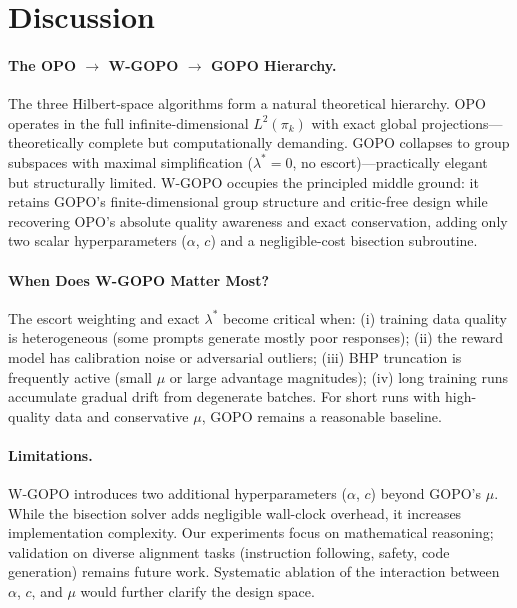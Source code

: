 \documentclass[11pt]{article}
\theoremstyle{definition}
\theoremstyle{remark}
\newcommand{\pik}{\pi_k}
\begin{document}
\section{Discussion}
\label{sec:discussion}

\paragraph{The OPO $\to$ W-GOPO $\to$ GOPO Hierarchy.}
The three Hilbert-space algorithms form a natural theoretical hierarchy. OPO operates in the full infinite-dimensional $L^2(\pik)$ with exact global projections---theoretically complete but computationally demanding. GOPO collapses to group subspaces with maximal simplification ($\lambda^* = 0$, no escort)---practically elegant but structurally limited. W-GOPO occupies the principled middle ground: it retains GOPO's finite-dimensional group structure and critic-free design while recovering OPO's absolute quality awareness and exact conservation, adding only two scalar hyperparameters ($\alpha$, $c$) and a negligible-cost bisection subroutine.

\paragraph{When Does W-GOPO Matter Most?}
The escort weighting and exact $\lambda^*$ become critical when: (i) training data quality is heterogeneous (some prompts generate mostly poor responses); (ii) the reward model has calibration noise or adversarial outliers; (iii) BHP truncation is frequently active (small $\mu$ or large advantage magnitudes); (iv) long training runs accumulate gradual drift from degenerate batches. For short runs with high-quality data and conservative $\mu$, GOPO remains a reasonable baseline.

\paragraph{Limitations.}
W-GOPO introduces two additional hyperparameters ($\alpha$, $c$) beyond GOPO's $\mu$. While the bisection solver adds negligible wall-clock overhead, it increases implementation complexity. Our experiments focus on mathematical reasoning; validation on diverse alignment tasks (instruction following, safety, code generation) remains future work. Systematic ablation of the interaction between $\alpha$, $c$, and $\mu$ would further clarify the design space.
\end{document}
